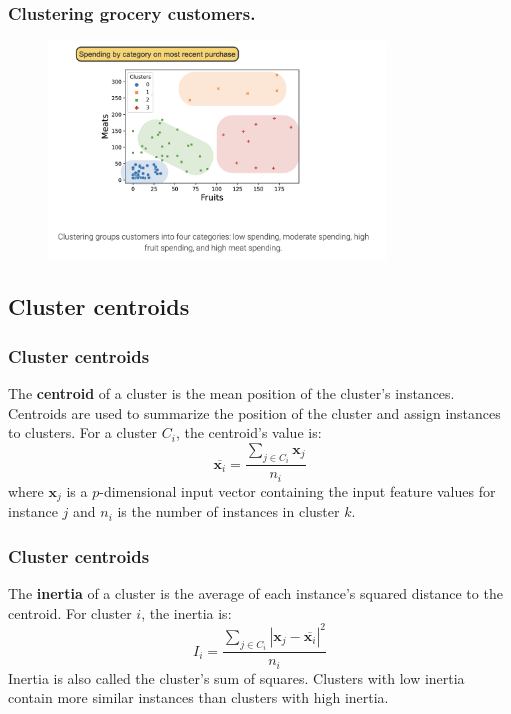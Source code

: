 \documentclass[10pt,dvipsnames]{beamer}
\begin{document}
\begin{frame}
    \frametitle{Clustering grocery customers.}
    \begin{figure}[ht]
        \centering
        \includegraphics[width=0.8\textwidth]{imgs/k_mean_5.png}
    \end{figure}
\end{frame}
\subsection{Cluster centroids}
\begin{frame}
    \frametitle{Cluster centroids}

    The \textbf{centroid} of a cluster is the mean position of the cluster's instances. Centroids are used to summarize the position of the cluster and
    assign instances to clusters. For a cluster $C_{i}$, the centroid's value is:
    $$
        \overline{\mathbf{x}_{i}}=\frac{\sum_{j \in C_{i}} \mathbf{x}_{j}}{n_{i}}
    $$
    where $\mathbf{x}_{j}$ is a $p$-dimensional input vector containing the input feature values for instance $j$ and $n_{i}$ is the number of instances in cluster $k$.

\end{frame}

\begin{frame}
    \frametitle{Cluster centroids}
    The \textbf{inertia} of a cluster is the average of each instance's squared distance to the centroid. For cluster $i$, the inertia is:
    $$
        I_{i}=\frac{\sum_{j \in C_{i}}\left|\mathbf{x}_{j}-\overline{\mathbf{x}_{i}}\right|^{2}}{n_{i}}
    $$
    Inertia is also called the cluster's sum of squares. Clusters with low inertia contain more similar instances than clusters with high inertia.
\end{frame}
\end{document}
